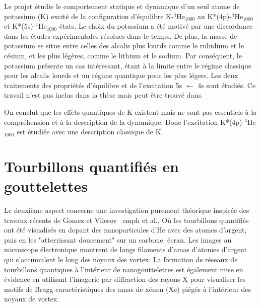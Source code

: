 		Le projet étudie le comportement statique et dynamique d'un seul atome de potassium (K) excité de la configuration d'équilibre K-$^4$He$_{1000}$ au K*(4p)-$^4$He$_{1000}$ et K*(5s)-$^4$He$_{1000}$ états. Le choix du potassium a été motivé par une discordance dans les études expérimentales résolues dans le temps\citep{Schulz2001,Reho2000-1,Reho2000-2}. De plus, la masse de potassium se situe entre celles des alcalis plus lourds comme le rubidium et le césium, et les plus légères, comme le lithium et le sodium. Par conséquent, le potassium présente un cas intéressant, étant à la limite entre le régime classique pour les alcalis lourds et un régime quantique pour les plus légers. Les deux traitements des propriétés d'équilibre et de l'excitation 5s $\leftarrow$ 4s sont étudiés. Ce travail n'est pas inclus dans la thèse mais peut être trouvé dans.
		
		On conclut que les effets quantiques de K existent mais ne sont pas essentiels à la compréhension et à la description de la dynamique. Donc l'excitation K*(4p)-$^4$He$_{1000}$ est étudiée avec une description classique de K.

	\section*{Tourbillons quantifiés en gouttelettes}
		Le deuxième aspect concerne une investigation purement théorique inspirée des travaux récents de Gomez et Vilesov \ emph {et al}., Où les tourbillons quantifiés ont été visualisés en dopant des nanoparticules d'He avec des atomes d'argent, puis en les "atterrissant doucement" sur un carbone. écran. Les images au microscope électronique montrent de longs filaments d'amas d'atomes d'argent qui s'accumulent le long des noyaux des vortex. La formation de réseaux de tourbillons quantiques à l'intérieur de nanogouttelettes est également mise en évidence en utilisant l'imagerie par diffraction des rayons X pour visualiser les motifs de Bragg caractéristiques des amas de xénon (Xe) piégés à l'intérieur des noyaux de vortex.
		
